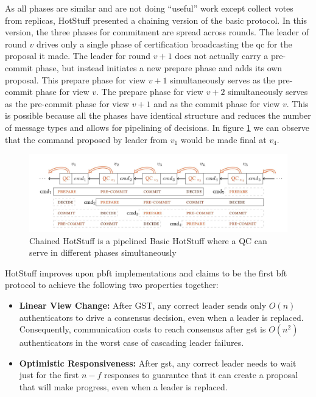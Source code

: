 
As all phases are similar and are not doing ``useful'' work except collect votes from replicas, HotStuff presented a chaining version of the basic protocol. In this version, the three phases for commitment are spread across rounds. The leader of round $v$ drives only a single phase of certification broadcasting the \gls{qc} for the proposal it made. The leader for round $v+1$ does not actually carry a pre-commit phase, but instead initiates a new prepare phase and adds its own proposal. This prepare phase for view $v+1$ simultaneously serves as the pre-commit phase for view $v$. The prepare phase for view $v+2$ simultaneously serves as the pre-commit phase for view $v+1$ and as the commit phase for view $v$. This is possible because all the phases have identical structure and reduces the number of message types and allows for pipelining of decisions. In figure \ref{fig:hotstuff-chain} we can observe that the command proposed by leader from $v_1$ would be made final at $v_4$.

\begin{figure}[h]
\centering
    \includegraphics[width=1.0\textwidth]{img/hotstuff-chain.jpeg}
    \caption{Chained HotStuff is a pipelined Basic HotStuff where a QC can serve in different phases simultaneously \citep{hotstuff}}
    \label{fig:hotstuff-chain}
\end{figure}

HotStuff improves upon \gls{pbft} implementations and claims to be the first \gls{bft} protocol to achieve the following two properties together:

\begin{itemize}
    \item \textbf{Linear View Change:} After GST, any correct leader sends only $O(n)$ authenticators to drive a consensus decision, even when a leader is replaced. Consequently, communication costs to reach consensus after \gls{gst} is $O(n^2)$ authenticators in the worst case of cascading leader failures.
    \item \textbf{Optimistic Responsiveness:} After \gls{gst}, any correct leader needs to wait just for the first $n-f$ responses to guarantee that it can create a proposal that will make progress, even when a leader is replaced.
\end{itemize}

